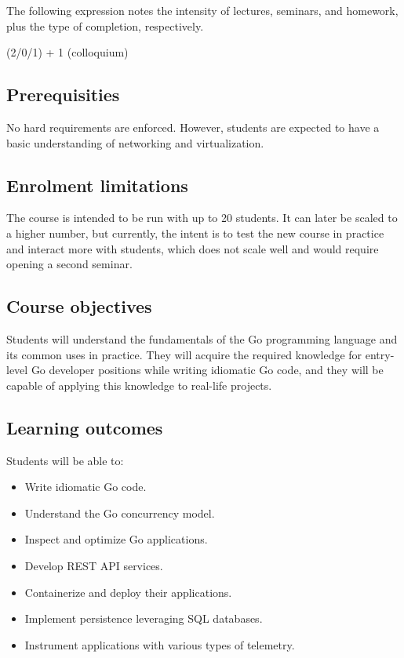 \documentclass[
  digital,
  color,
  oneside,
  nosansbold,
  nocolorbold,
  lof,
  lot,
]{fithesis4}
\begin{document}
The following expression notes the intensity of lectures, seminars, and homework, plus the type of completion, respectively.

(2/0/1) + 1 (colloquium)

\subsection{Prerequisities}

No hard requirements are enforced. However, students are expected to have a basic understanding of networking and virtualization.

\subsection{Enrolment limitations}

The course is intended to be run with up to 20 students. It can later be scaled to a higher number, but currently, the intent is to test the new course in practice and interact more with students, which does not scale well and would require opening a second seminar.

\subsection{Course objectives}

Students will understand the fundamentals of the Go programming language and its common uses in practice. They will acquire the required knowledge for entry-level Go developer positions while writing idiomatic Go code, and they will be capable of applying this knowledge to real-life projects.

\subsection{Learning outcomes}

Students will be able to:
\begin{itemize}
    \item Write idiomatic Go code.
    \item Understand the Go concurrency model.
    \item Inspect and optimize Go applications.
    \item Develop REST API services.
    \item Containerize and deploy their applications.
    \item Implement persistence leveraging SQL databases.
    \item Instrument applications with various types of telemetry.
\end{itemize}
\end{document}
